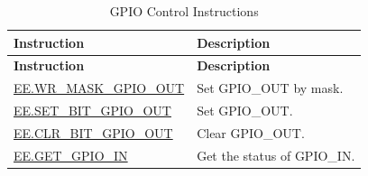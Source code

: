 \begin{longtable}[c]{|l|m{10cm}|}
    \caption{GPIO Control Instructions}
    \label{tab:pie-gpio-instructions}\\
    \hline
    \rowcolor{lightgray}
    \textbf{Instruction} & \textbf{Description} \\\hline
    \endfirsthead
    \rowcolor{lightgray}
    \textbf{Instruction} & \textbf{Description} \\\hline
    \endhead
    \endfoot

    \hyperref[instruction:EEWRMASKGPIOOUT]{EE.WR\_MASK\_GPIO\_OUT} & Set GPIO\_OUT by mask.
    \\\hline
    \hyperref[instruction:EESETBITGPIOOUT]{EE.SET\_BIT\_GPIO\_OUT} & Set GPIO\_OUT.
    \\\hline
    \hyperref[instruction:EECLRBITGPIOOUT]{EE.CLR\_BIT\_GPIO\_OUT} & Clear GPIO\_OUT.
    \\\hline
    \hyperref[instruction:EEGETGPIOIN]{EE.GET\_GPIO\_IN} & Get the status of GPIO\_IN.
    \\\hline
\end{longtable}